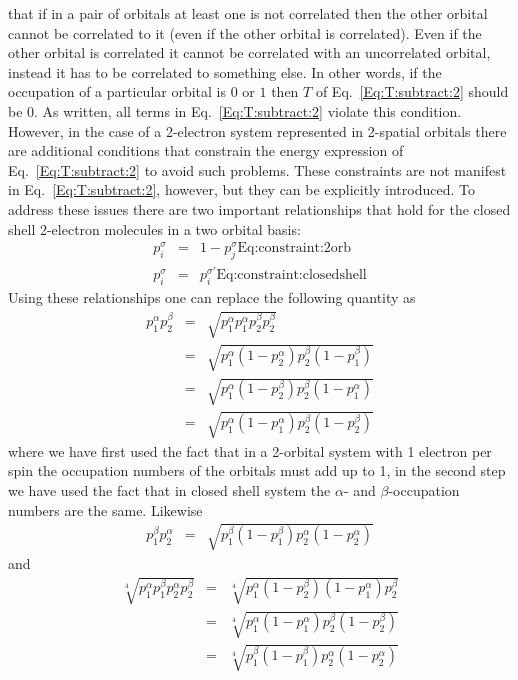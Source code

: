 \documentclass[pra,nofootinbib]{revtex4-1}
\newcommand{\dlabel}[1]{\text{#1}\label{#1}}
\begin{document}
that if in a pair of orbitals at least one is not correlated then the other orbital cannot be correlated
to it (even if the other orbital is correlated). Even if the other orbital is correlated it cannot be
correlated with an uncorrelated orbital, instead it has to be correlated to something else.
In other words, if the occupation of a particular orbital is $0$ or $1$ then $T$ of Eq.~\ref{Eq:T:subtract:2}
should be $0$. As written, all terms in Eq.~\ref{Eq:T:subtract:2} violate this condition. However, in the case
of a 2-electron system represented in 2-spatial orbitals there are additional conditions that constrain
the energy expression of Eq.~\ref{Eq:T:subtract:2} to avoid such problems. These constraints are not manifest
in Eq.~\ref{Eq:T:subtract:2}, however, but they can be explicitly introduced.
To address these issues there are two important relationships that hold for the closed shell 
2-electron molecules in a two orbital basis:
\begin{eqnarray}
  p_i^\sigma &=& 1-p_j^\sigma  \dlabel{Eq:constraint:2orb} \\
  p_i^\sigma &=& p_i^{\sigma'} \dlabel{Eq:constraint:closedshell}
\end{eqnarray}
Using these relationships one can replace the following quantity as
\begin{eqnarray}
  p_1^\alpha p_2^\beta 
  &=& \sqrt{p_1^\alpha p_1^\alpha p_2^\beta p_2^\beta} \\
  &=& \sqrt{p_1^\alpha(1-p_2^\alpha)p_2^\beta(1-p_1^\beta)} \\
  &=& \sqrt{p_1^\alpha(1-p_2^\beta)p_2^\beta(1-p_1^\alpha)} \\
  &=& \sqrt{p_1^\alpha(1-p_1^\alpha)p_2^\beta(1-p_2^\beta)}
\end{eqnarray}
where we have first used the fact that in a 2-orbital system with 1 electron
per spin the occupation numbers of the orbitals must add up to 1, in the second
step we have used the fact that in closed shell system the $\alpha$- and $\beta$-occupation
numbers are the same.
Likewise
\begin{eqnarray}
  p_1^\beta p_2^\alpha 
  &=& \sqrt{p_1^\beta(1-p_1^\beta)p_2^\alpha(1-p_2^\alpha)}
\end{eqnarray}
and
\begin{eqnarray}
  \sqrt[4]{p_1^\alpha p_1^\beta p_2^\alpha p_2^\beta}
  &=& \sqrt[4]{p_1^\alpha (1-p_2^\beta)(1-p_1^\alpha)p_2^\beta} \\
  &=& \sqrt[4]{p_1^\alpha (1-p_1^\alpha) p_2^\beta (1-p_2^\beta)} \\
  &=& \sqrt[4]{p_1^\beta (1-p_1^\beta) p_2^\alpha (1-p_2^\alpha)}
\end{eqnarray}
\end{document}
